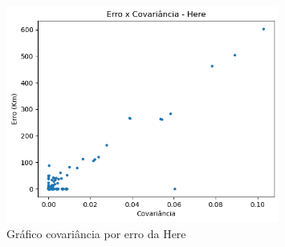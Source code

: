 \begin{figure}[h]
  \centering
  \includegraphics[width=0.8\textwidth]{Figuras/ErroCovH.png}
  \caption{Gráfico covariância por erro da Here}
  \label{fig:CovErroH}
\end{figure}
